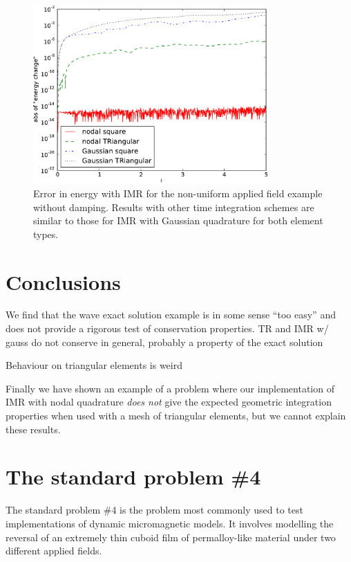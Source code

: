 \begin{figure}
  \centering
  \includegraphics[width=0.8\textwidth]
  {plots/nonuniform-h-triangles-energy-error/absofenergychangevstimes.pdf}
  \caption{Error in energy with IMR for the non-uniform applied field example without damping.
 Results with other time integration schemes are similar to those for IMR with Gaussian quadrature for both element types.}
  \label{fig:energy-error-triangle-mesh}
\end{figure}

\section{Conclusions}

We find that the wave exact solution example is in some sense ``too easy'' and does not provide a rigorous test of conservation properties.
TR and IMR w/ gauss do not conserve in general, probably a property of the exact solution

Behaviour on triangular elements is weird


Finally we have shown an example of a problem where our implementation of IMR with nodal quadrature \emph{does not} give the expected geometric integration properties when used with a mesh of triangular elements, but we cannot explain these results.




\FloatBarrier
\section{The \mumag standard problem \#4}

The \mumag standard problem \#4 is the problem most commonly used to test implementations of dynamic micromagnetic models.
It involves modelling the reversal of an extremely thin cuboid film of permalloy-like material under two different applied fields.


